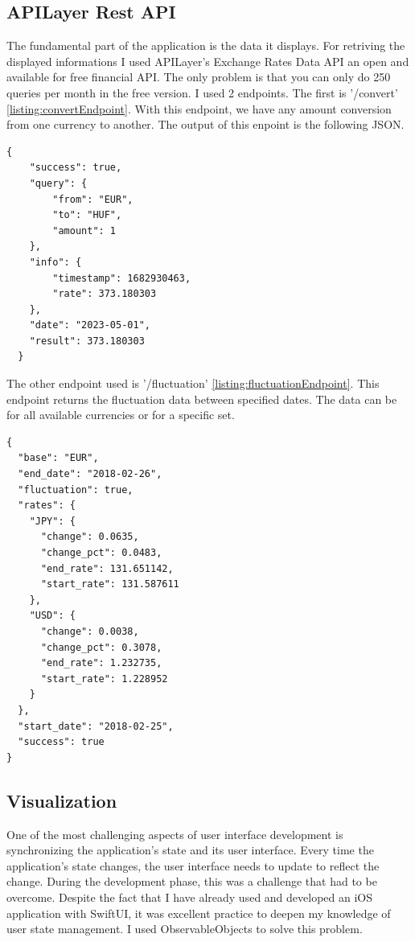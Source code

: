 \documentclass[a4paper,oneside]{article}
\begin{document}
\subsection{APILayer Rest API}

The fundamental part of the application is the data it displays. For retriving the displayed informations I used APILayer's Exchange Rates Data API an open and available for free financial API.  The only problem is that you can only do 250 queries per month in the free version. I used 2 endpoints. The first is '/convert' \ref{listing:convertEndpoint}. With this endpoint, we have any amount conversion from one currency to another. The output of this enpoint is the following JSON.

\begin{lstlisting}[frame=single,float=!ht,caption=JSON from /convert endpoint, label=listing:convertEndpoint]
  {
    "success": true,
    "query": {
        "from": "EUR",
        "to": "HUF",
        "amount": 1
    },
    "info": {
        "timestamp": 1682930463,
        "rate": 373.180303
    },
    "date": "2023-05-01",
    "result": 373.180303
  }
\end{lstlisting}

The other endpoint used is '/fluctuation' \ref{listing:fluctuationEndpoint}. This endpoint returns the fluctuation data between specified dates. The data can be for all available currencies or for a specific set.


\begin{lstlisting}[frame=single,float=!ht,caption=JSON from /fluctuation endpoint, label=listing:fluctuationEndpoint]
{
  "base": "EUR",
  "end_date": "2018-02-26",
  "fluctuation": true,
  "rates": {
    "JPY": {
      "change": 0.0635,
      "change_pct": 0.0483,
      "end_rate": 131.651142,
      "start_rate": 131.587611
    },
    "USD": {
      "change": 0.0038,
      "change_pct": 0.3078,
      "end_rate": 1.232735,
      "start_rate": 1.228952
    }
  },
  "start_date": "2018-02-25",
  "success": true
}
\end{lstlisting}

\newpage
\subsection{Visualization}


One of the most challenging aspects of user interface development is synchronizing the application's state and its user interface. Every time the application's state changes, the user interface needs to update to reflect the change. During the development phase, this was a challenge that had to be overcome. Despite the fact that I have already used and developed an iOS application with SwiftUI, it was excellent practice to deepen my knowledge of user state management. I used ObservableObjects to solve this problem.
\end{document}
